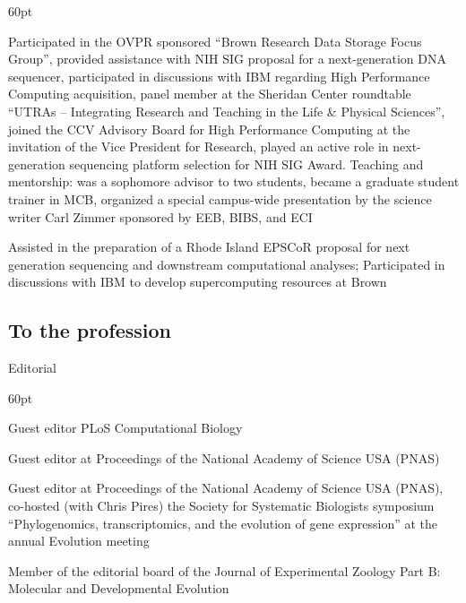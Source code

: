 \begin{entry}{60pt}
\item [\rm 2009] Participated in the OVPR sponsored ``Brown Research Data Storage Focus Group'', provided assistance with NIH SIG proposal for a next-generation DNA sequencer, participated in discussions with IBM regarding High Performance Computing acquisition, panel member at the Sheridan Center roundtable ``UTRAs -- Integrating Research and Teaching in the Life \& Physical Sciences'', joined the CCV Advisory Board for High Performance Computing at the invitation of the Vice President for Research, played an active role in next-generation sequencing platform selection for NIH SIG Award. Teaching and mentorship: was a sophomore advisor to two students, became a graduate student trainer in MCB, organized a special campus-wide presentation by the science writer Carl Zimmer sponsored by EEB, BIBS, and ECI

\item [\rm 2008] Assisted in the preparation of a Rhode Island EPSCoR proposal for next generation sequencing and downstream computational analyses; Participated in discussions with IBM to develop supercomputing resources at Brown


\end{entry}



\subsection{To the profession}

Editorial
\begin{entry}{60pt}
\item [\rm 2025] Guest editor PLoS Computational Biology
\item [\rm 2015] Guest editor at Proceedings of the National Academy of Science USA (PNAS)
\item [\rm 2014] Guest editor at Proceedings of the National Academy of Science USA (PNAS), co-hosted (with Chris Pires) the Society for Systematic Biologists symposium ``Phylogenomics, transcriptomics, and the evolution of gene expression'' at the annual Evolution meeting
\item [\rm 2012-2014] Member of the editorial board of the Journal of Experimental Zoology Part B: Molecular and Developmental Evolution
\end{entry}

